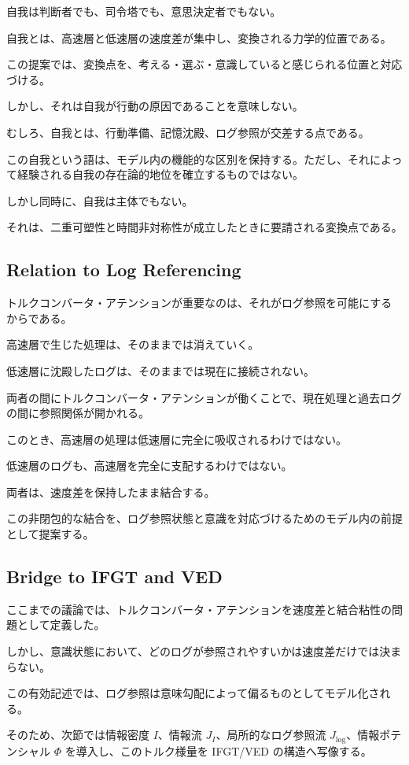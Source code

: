 自我は判断者でも、司令塔でも、意思決定者でもない。

自我とは、高速層と低速層の速度差が集中し、変換される力学的位置である。

この提案では、変換点を、考える・選ぶ・意識していると感じられる位置と対応づける。

しかし、それは自我が行動の原因であることを意味しない。

むしろ、自我とは、行動準備、記憶沈殿、ログ参照が交差する点である。

この自我という語は、モデル内の機能的な区別を保持する。ただし、それによって経験される自我の存在論的地位を確立するものではない。

しかし同時に、自我は主体でもない。

それは、二重可塑性と時間非対称性が成立したときに要請される変換点である。

\subsection{Relation to Log Referencing}

トルクコンバータ・アテンションが重要なのは、それがログ参照を可能にするからである。

高速層で生じた処理は、そのままでは消えていく。

低速層に沈殿したログは、そのままでは現在に接続されない。

両者の間にトルクコンバータ・アテンションが働くことで、現在処理と過去ログの間に参照関係が開かれる。

このとき、高速層の処理は低速層に完全に吸収されるわけではない。

低速層のログも、高速層を完全に支配するわけではない。

両者は、速度差を保持したまま結合する。

この非閉包的な結合を、ログ参照状態と意識を対応づけるためのモデル内の前提として提案する。

\subsection{Bridge to IFGT and VED}

ここまでの議論では、トルクコンバータ・アテンションを速度差と結合粘性の問題として定義した。

しかし、意識状態において、どのログが参照されやすいかは速度差だけでは決まらない。

この有効記述では、ログ参照は意味勾配によって偏るものとしてモデル化される。

そのため、次節では情報密度 $I$、情報流 $J_I$、局所的なログ参照流 $J_{\log}$、情報ポテンシャル $\Phi$ を導入し、このトルク様量を IFGT/VED の構造へ写像する。

